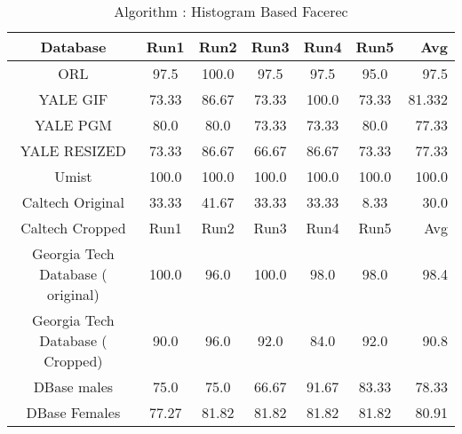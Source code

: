 \documentclass[10pt,a4paper]{article}
\begin{document}
\begin{center}
\begin{table}
\caption{Algorithm : Histogram Based Facerec }
\centering
\begin{tabular}{| c | c | c | c | c | c | r | } \hline 
Database & Run1 & Run2 & Run3 & Run4 & Run5 & Avg  \\  
\hline
ORL & 97.5 & 100.0 & 97.5 & 97.5 & 95.0 & 97.5 \\
\hline
YALE GIF & 73.33 & 86.67 & 73.33 & 100.0 & 73.33 & 81.332 \\
\hline
YALE PGM & 80.0 & 80.0 & 73.33 & 73.33 & 80.0 & 77.33 \\
\hline
YALE RESIZED & 73.33 & 86.67 & 66.67 & 86.67 & 73.33 & 77.33 \\
\hline
Umist & 100.0 & 100.0 & 100.0 & 100.0 & 100.0 & 100.0 \\
\hline
Caltech Original & 33.33 & 41.67 & 33.33 & 33.33 & 8.33 & 30.0 \\
\hline
Caltech Cropped & Run1 & Run2 & Run3 & Run4 & Run5 & Avg \\
\hline
Georgia Tech Database ( original) & 100.0 & 96.0 & 100.0 & 98.0 & 98.0 & 98.4 \\
\hline
Georgia Tech Database ( Cropped) & 90.0 & 96.0 & 92.0 & 84.0 & 92.0 & 90.8 \\
\hline
DBase males & 75.0 & 75.0 & 66.67 & 91.67 & 83.33 & 78.33 \\
\hline
DBase Females  & 77.27 & 81.82 & 81.82 & 81.82 & 81.82 & 80.91 \\
\hline
\end{tabular}
\end{table}



\end{center}
\end{document}
